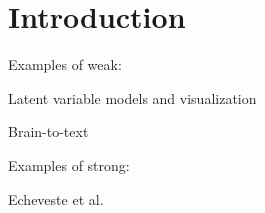 \chapter{Introduction}


Examples of weak:

Latent variable models and visualization

Brain-to-text \citep{willett2021high}

Examples of strong:

Echeveste et al.